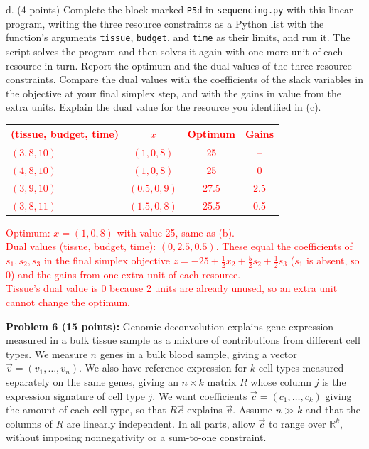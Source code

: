 \documentclass[11pt]{article}
\begin{document}
d. (4 points) Complete the block marked {\tt P5d} in {\tt sequencing.py} with this linear
program, writing the three resource constraints as a Python list with the function's
arguments {\tt tissue}, {\tt budget}, and {\tt time} as their limits, and run it. The script solves the program and then solves it again with one more unit of
each resource in turn. Report the optimum and the dual values of the three resource constraints.
Compare the dual values with the coefficients of the slack variables in the objective at
your final simplex step, and with the gains in value from the extra units. Explain the dual
value for the resource you identified in (c).
\textcolor{red}{
\begin{center}
\begin{tabular}{lccc}
(tissue, budget, time) & $x$ & Optimum & Gains \\ \hline
$(3, 8, 10)$ & $(1, 0, 8)$ & 25 & -- \\
$(4, 8, 10)$ & $(1, 0, 8)$ & 25 & 0 \\
$(3, 9, 10)$ & $(0.5, 0, 9)$ & 27.5 & 2.5 \\
$(3, 8, 11)$ & $(1.5, 0, 8)$ & 25.5 & 0.5
\end{tabular}
\end{center}
Optimum: $x = (1, 0, 8)$ with value 25, same as (b).\\
Dual values (tissue, budget, time): $(0, 2.5, 0.5)$. These equal the coefficients of $s_1, s_2, s_3$ in the final simplex objective $z = -25 + \tfrac12 x_2 + \tfrac52 s_2 + \tfrac12 s_3$ ($s_1$ is absent, so 0) and the gains from one extra unit of each resource.\\
Tissue's dual value is 0 because 2 units are already unused, so an extra unit cannot change the optimum.
}

\vspace{0.5em}
{\bf Problem 6 (15 points):} Genomic deconvolution explains gene expression measured in a bulk
tissue sample as a mixture of contributions from different cell types. We measure $n$ genes in
a bulk blood sample, giving a vector $\vec v=(v_1,\ldots,v_n)$. We also have reference expression
for $k$ cell types measured separately on the same genes, giving an $n\times k$ matrix $R$ whose
column $j$ is the expression signature of cell type $j$. We want coefficients
$\vec c=(c_1,\ldots,c_k)$ giving the amount of each cell type, so that $R\vec c$ explains
$\vec v$. Assume $n\gg k$ and that the columns of $R$ are linearly independent.
In all parts, allow $\vec c$ to range over $\mathbb R^k$, without imposing nonnegativity or a
sum-to-one constraint.
\end{document}
